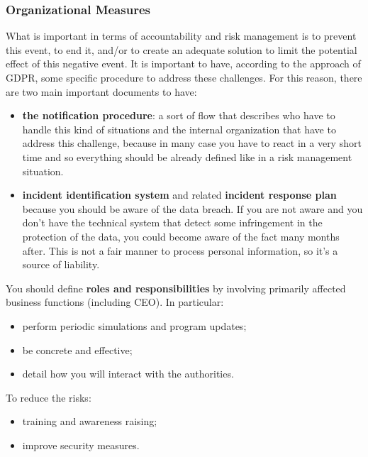 \subsubsection{Organizational Measures}
What is important in terms of accountability and risk management is to prevent this event, to end it, and/or to create an adequate solution to limit the potential effect of this negative event. It is important to have, according to the approach of GDPR, some specific procedure to address these challenges. For this reason, there are two main important documents to have:
\begin{itemize}
    \item \textbf{the notification procedure}: a sort of flow that describes who have to handle this kind of situations and the internal organization that have to address this challenge, because in many case you have to react in a very short time and so everything should be already defined like in a risk management situation.
    \item \textbf{incident identification system} and related \textbf{incident response plan} because you should be aware of the data breach. If you are not aware and you don’t have the technical system that detect some infringement in the protection of the data, you could become aware of the fact many months after. This is not a fair manner to process personal information, so it’s a source of liability.
\end{itemize}
You should define \textbf{roles and responsibilities} by involving primarily affected business functions (including CEO). In particular:
\begin{itemize}
    \item perform periodic simulations and program updates;
    \item be concrete and effective;
    \item detail how you will interact with the authorities.
\end{itemize}

To reduce the risks:
\begin{itemize}
    \item training and awareness raising;
    \item improve security measures.
\end{itemize}

